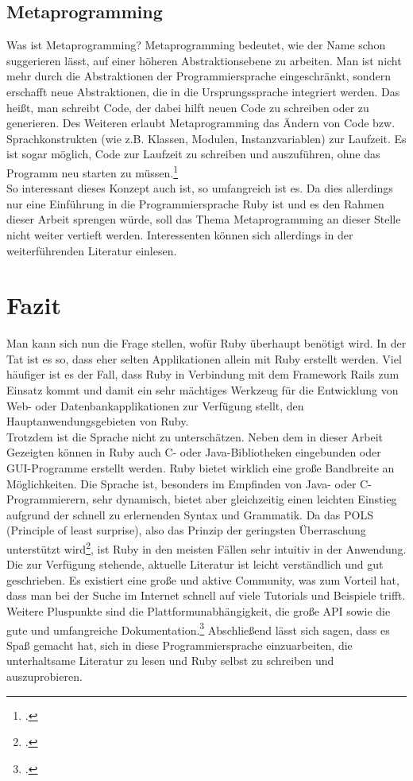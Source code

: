 \documentclass[a4paper, 11pt]{scrreprt}
\begin{document}
\section{Metaprogramming}
Was ist Metaprogramming? Metaprogramming bedeutet, wie der Name schon suggerieren lässt, auf einer höheren Abstraktionsebene zu arbeiten. Man ist nicht mehr durch die Abstraktionen der Programmiersprache eingeschränkt, sondern erschafft neue Abstraktionen, die in die Ursprungssprache integriert werden. Das heißt, man schreibt Code, der dabei hilft neuen Code zu schreiben oder zu generieren.
Des Weiteren erlaubt Metaprogramming das Ändern von Code bzw. Sprachkonstrukten (wie z.B. Klassen, Modulen, Instanzvariablen) zur Laufzeit. Es ist sogar möglich, Code zur Laufzeit zu schreiben und auszuführen, ohne das Programm neu starten zu müssen.\footcite[vgl.][S.373-408]{p_ruby}\\
So interessant dieses Konzept auch ist, so umfangreich ist es. Da dies allerdings nur eine Einführung in die Programmiersprache Ruby ist und es den Rahmen dieser Arbeit sprengen würde, soll das Thema Metaprogramming an dieser Stelle nicht weiter vertieft werden. Interessenten können sich allerdings in der weiterführenden Literatur einlesen.


\chapter{Fazit}
Man kann sich nun die Frage stellen, wofür Ruby überhaupt benötigt wird. In der Tat ist es so, dass eher selten Applikationen allein mit Ruby erstellt werden. Viel häufiger ist es der Fall, dass Ruby in Verbindung mit dem Framework Rails zum Einsatz kommt und damit ein sehr mächtiges Werkzeug für die Entwicklung von Web- oder Datenbankapplikationen zur Verfügung stellt, den Hauptanwendungsgebieten von Ruby.\\
Trotzdem ist die Sprache nicht zu unterschätzen. Neben dem in dieser Arbeit Gezeigten können in Ruby auch C- oder Java-Bibliotheken eingebunden oder GUI-Programme erstellt werden. Ruby bietet wirklich eine große Bandbreite an Möglichkeiten. Die Sprache ist, besonders im Empfinden von Java- oder C-Programmierern, sehr dynamisch, bietet aber gleichzeitig einen leichten Einstieg aufgrund der schnell zu erlernenden Syntax und Grammatik. Da das POLS (Principle of least surprise), also das Prinzip der geringsten Überraschung unterstützt wird\footcite[vgl.][S.486]{ruby}, ist Ruby in den meisten Fällen sehr intuitiv in der Anwendung.\\
Die zur Verfügung stehende, aktuelle Literatur ist leicht verständlich und gut geschrieben. Es existiert eine große und aktive Community, was zum Vorteil hat, dass man bei der Suche im Internet schnell auf viele Tutorials und Beispiele trifft. Weitere Pluspunkte sind die Plattformunabhängigkeit, die große API sowie die gute und umfangreiche Dokumentation.\footcite{ruby_doc}
Abschließend lässt sich sagen, dass es Spaß gemacht hat, sich in diese Programmiersprache einzuarbeiten, die unterhaltsame Literatur zu lesen und Ruby selbst zu schreiben und auszuprobieren. 
\newpage
\singlespacing



\end{document}
